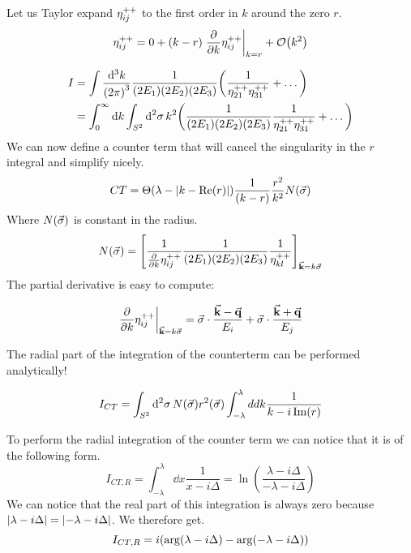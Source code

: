 Let us Taylor expand $\eta_{ij}^{++}$ to the first order in $k$ around the zero $r$.
\begin{equation}
    \ELIPT{i}{j} = 0 + (k-r) \eval{\pdv{k} \ELIPT{i}{j}}_{k=r} + \order{k^2}
\end{equation}

\begin{align}
    I &= \int \frac{\dd[3]{k}}{{(2\pi)}^3} \frac{1}{(2E_1)(2E_2)(2E_3)} \qty(\frac{1}{\eta_{21}^{++}\eta_{31}^{++}} + \dots)\\
    &= \int_{0}^{\infty} \dd{k} \int_{S^2} \dd[2]{\sigma} k^2 \qty(\frac{1}{(2E_1)(2E_2)(2E_3)} \frac{1}{\eta_{21}^{++}\eta_{31}^{++}} + \dots)
\end{align}
We can now define a counter term that will cancel the singularity in the $r$ integral and simplify nicely.
\begin{equation}
    CT = \Theta(\lambda-\abs{k-\Re(r)}) \frac{1}{(k-r)}\frac{r^2}{k^2} N(\va{\sigma})
\end{equation}
Where $N(\va{\sigma})$ is constant in the radius.
\begin{equation}
    N(\va{\sigma}) = \qty[\frac{1}{\pdv{k} \eta_{ij}^{++}}\frac{1}{(2E_1)(2E_2)(2E_3)} \frac{1}{\eta_{kl}^{++}}]_{\va{k} = k\va{\sigma}}
\end{equation}
The partial derivative is easy to compute:

\begin{equation}
    \eval{\pdv{k} \ELIPT{i}{j}}_{\va{k}=k\va{\sigma}} = \va{\sigma}\cdot\frac{\va{k}-\va{q}}{E_i} + \va{\sigma}\cdot\frac{\va{k}+\va{q}}{E_j}
\end{equation}

The radial part of the integration of the counterterm can be performed analytically!

\begin{equation}
    I_{CT} = \int_{S^2} \dd[2]{\sigma} N(\va{\sigma}) r^2(\va{\sigma}) \int_{-\lambda}^{\lambda} \\dd{k} \frac{1}{k-i\Im(r)}
\end{equation}

To perform the radial integration of the counter term we can notice that it is of the following form.
\begin{equation}
    I_{CT, R} = \int_{-\lambda}^{\lambda} \dd{x} \frac{1}{x-i\Delta} = \ln(\frac{\lambda-i\Delta}{-\lambda-i\Delta})
\end{equation}
We can notice that the real part of this integration is always zero because $\abs{\lambda-i\Delta} = \abs{-\lambda-i\Delta}$. We therefore get.
\begin{equation}
    I_{CT, R} = i\qty(\arg(\lambda-i\Delta) - \arg(-\lambda-i\Delta))
\end{equation}

